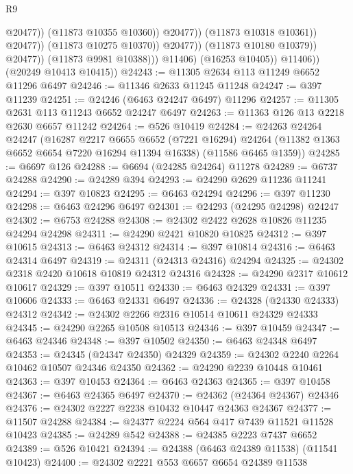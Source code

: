 \begin{lexlean}{R9}
\begin{coremodule}
                                              @20477))
                                          (@11873 @10355 @10360))
                                        @20477))
                                    (@11873 @10318 @10361))
                                  @20477))
                              (@11873 @10275 @10370))
                            @20477))
                        (@11873 @10180 @10379))
                      @20477))
                  (@11873 @9981 @10388)))
              @11406)
            (@16253 @10405))
          @11406))
      (@20249 @10413 @10415))
@24243 := @11305 @2634 @113 @11249 @6652 @11296 @6497
@24246 := @11346 @2633 @11245 @11248
@24247 := @397 @11239
@24251 := @24246 (@6463 @24247 @6497) @11296
@24257 := @11305 @2631 @113 @11243 @6652 @24247 @6497
@24263 := @11363 @126 @13 @2218 @2630 @6657 @11242
@24264 := @526 @10419
@24284 := @24263
    @24264
    @24247
    (@16287
      @2217
      @6655
      @6652
      (@7221 @16294)
      @24264
      (@11382 @1363 @6652 @6654 @7220 @16294 @11394 @16338)
      (@11586 @6465 @1359))
@24285 := @6697 @126
@24288 := @6694 (@24285 @24264) @11278
@24289 := @6737 @24288
@24290 := @24289 @394
@24293 := @24290 @2629 @11236 @11241
@24294 := @397 @10823
@24295 := @6463 @24294
@24296 := @397 @11230
@24298 := @6463 @24296 @6497
@24301 := @24293 (@24295 @24298) @24247
@24302 := @6753 @24288
@24308 := @24302 @2422 @2628 @10826 @11235 @24294 @24298
@24311 := @24290 @2421 @10820 @10825
@24312 := @397 @10615
@24313 := @6463 @24312
@24314 := @397 @10814
@24316 := @6463 @24314 @6497
@24319 := @24311 (@24313 @24316) @24294
@24325 := @24302 @2318 @2420 @10618 @10819 @24312 @24316
@24328 := @24290 @2317 @10612 @10617
@24329 := @397 @10511
@24330 := @6463 @24329
@24331 := @397 @10606
@24333 := @6463 @24331 @6497
@24336 := @24328 (@24330 @24333) @24312
@24342 := @24302 @2266 @2316 @10514 @10611 @24329 @24333
@24345 := @24290 @2265 @10508 @10513
@24346 := @397 @10459
@24347 := @6463 @24346
@24348 := @397 @10502
@24350 := @6463 @24348 @6497
@24353 := @24345 (@24347 @24350) @24329
@24359 := @24302 @2240 @2264 @10462 @10507 @24346 @24350
@24362 := @24290 @2239 @10448 @10461
@24363 := @397 @10453
@24364 := @6463 @24363
@24365 := @397 @10458
@24367 := @6463 @24365 @6497
@24370 := @24362 (@24364 @24367) @24346
@24376 := @24302 @2227 @2238 @10432 @10447 @24363 @24367
@24377 := @11507 @24288
@24384 := @24377 @2224 @564 @417 @7439 @11521 @11528 @10423
@24385 := @24289 @542
@24388 := @24385 @2223 @7437 @6652
@24389 := @526 @10421
@24394 := @24388 (@6463 @24389 @11538) (@11541 @10423)
@24400 := @24302 @2221 @553 @6657 @6654 @24389 @11538

\end{coremodule}
\end{lexlean}
